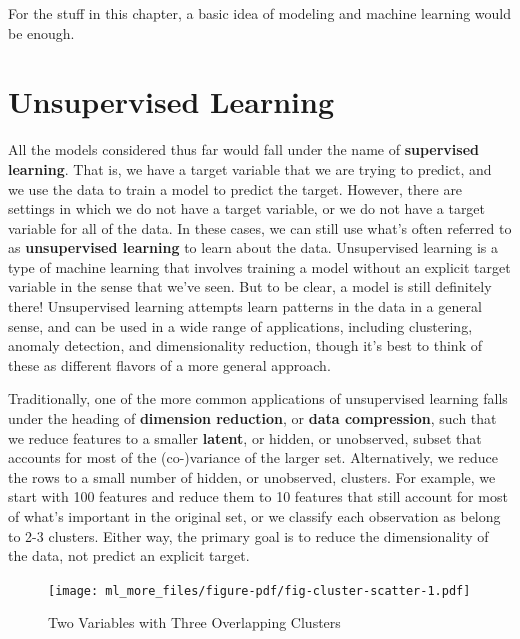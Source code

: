 \documentclass[
  letterpaper,
]{krantz}
\begin{document}
For the stuff in this chapter, a basic idea of modeling and machine
learning would be enough.

\section{Unsupervised Learning}\label{unsupervised-learning}

All the models considered thus far would fall under the name of
\textbf{supervised learning}. That is, we have a target variable that we
are trying to predict, and we use the data to train a model to predict
the target. However, there are settings in which we do not have a target
variable, or we do not have a target variable for all of the data. In
these cases, we can still use what's often referred to as
\textbf{unsupervised learning} to learn about the data. Unsupervised
learning is a type of machine learning that involves training a model
without an explicit target variable in the sense that we've seen. But to
be clear, a model is still definitely there! Unsupervised learning
attempts learn patterns in the data in a general sense, and can be used
in a wide range of applications, including clustering, anomaly
detection, and dimensionality reduction, though it's best to think of
these as different flavors of a more general approach.

Traditionally, one of the more common applications of unsupervised
learning falls under the heading of \textbf{dimension reduction}, or
\textbf{data compression}, such that we reduce features to a smaller
\textbf{latent}, or hidden, or unobserved, subset that accounts for most
of the (co-)variance of the larger set. Alternatively, we reduce the
rows to a small number of hidden, or unobserved, clusters. For example,
we start with 100 features and reduce them to 10 features that still
account for most of what's important in the original set, or we classify
each observation as belong to 2-3 clusters. Either way, the primary goal
is to reduce the dimensionality of the data, not predict an explicit
target.

\begin{figure}

{\centering \texttt{[image: ml\_more\_files/figure-pdf/fig-cluster-scatter-1.pdf]}

}

\caption{\label{fig-cluster-scatter}Two Variables with Three Overlapping
Clusters}

\end{figure}
\end{document}
